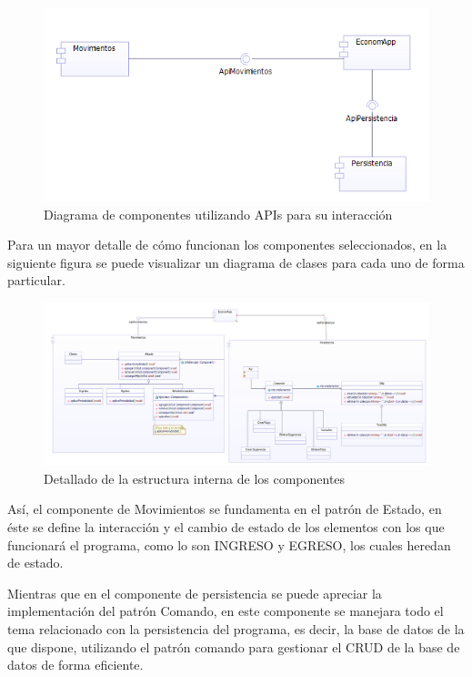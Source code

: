 \begin{figure}[H]
	\centering
	\includegraphics[width=1\linewidth]{parte2/imgs/DiagramaDeComponentes/api}
	\caption{Diagrama de componentes utilizando APIs para su interacción}
	\label{fig:api}
\end{figure}

Para un mayor detalle de cómo funcionan los componentes seleccionados, en la siguiente figura se puede visualizar un diagrama de clases para cada uno de forma particular.

\begin{figure}[H]
	\centering
	\includegraphics[width=1\linewidth]{parte2/imgs/DiagramaDeComponentes/apiDetallado}
	\caption{Detallado de la estructura interna de los componentes}
	\label{fig:apidetallado}
\end{figure}

Así, el componente de Movimientos se fundamenta en el patrón de Estado, en éste se define la interacción y el cambio de estado de los elementos con los que funcionará el programa, como lo son INGRESO y EGRESO, los cuales heredan de estado. 	

Mientras que en el componente de persistencia se puede apreciar la implementación del patrón Comando, en este componente se manejara todo el tema relacionado con la persistencia del programa, es decir, la base de datos de la que dispone, utilizando el patrón comando para gestionar el CRUD de la base de datos de forma eficiente. 